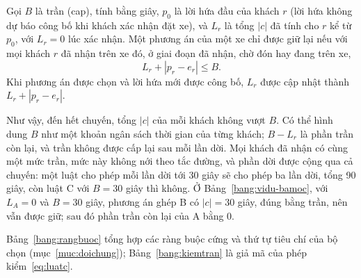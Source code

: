 \begin{dinhnghia}[Luật C]
\label{dn:luatc}
Gọi $B$ là trần (cap), tính bằng giây, $p_0$ là lời hứa đầu của khách $r$ (lời hứa không dự báo công
bố khi khách xác nhận đặt xe), và $L_r$ là tổng $|c|$ đã tính cho $r$ kể từ $p_0$, với $L_r = 0$ lúc
xác nhận. Một phương án của một xe chỉ được giữ lại nếu với mọi khách $r$ đã nhận trên xe đó, ở giai
đoạn đã nhận, chờ đón hay đang trên xe,
\begin{equation}
L_r + |p_r - e_r| \le B .
\label{eq:luatc}
\end{equation}
Khi phương án được chọn và lời hứa mới được công bố, $L_r$ được cập nhật thành $L_r + |p_r - e_r|$.
\end{dinhnghia}

Như vậy, đến hết chuyến, tổng $|c|$ của mỗi khách không vượt $B$. Có thể hình dung $B$ như một khoản ngân
sách thời gian của từng khách; $B - L_r$ là phần trần còn lại, và trần không được cấp lại sau mỗi lần dời.
Mọi khách đã nhận có cùng một mức trần, mức này không nới theo tắc đường, và phần dời được cộng qua cả
chuyến: một luật cho phép mỗi lần dời tới 30 giây sẽ cho phép ba lần dời, tổng 90 giây, còn luật C với
$B = 30$ giây thì không. Ở Bảng~\ref{bang:vidu-bamoc}, với $L_A = 0$ và $B = 30$ giây, phương án ghép B
có $|c| = 30$ giây, đúng bằng trần, nên vẫn được giữ; sau đó phần trần còn lại của A bằng 0.

Bảng~\ref{bang:rangbuoc} tổng hợp các ràng buộc cứng và thứ tự tiêu chí của bộ chọn
(mục~\ref{muc:doichung}); Bảng~\ref{bang:kiemtran} là giả mã của phép kiểm~\eqref{eq:luatc}.

